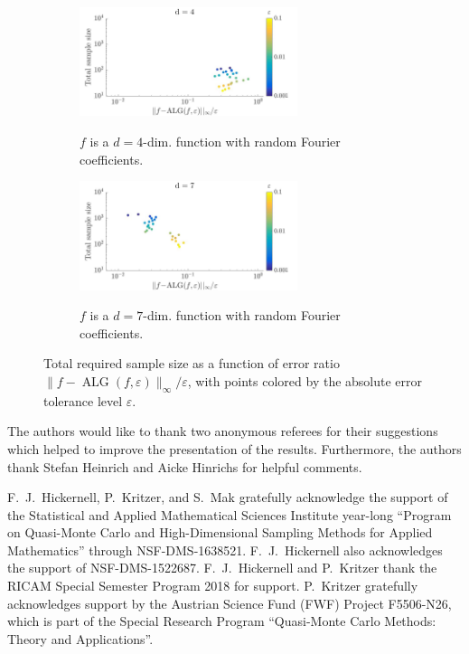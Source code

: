 \documentclass[USenglish]{article}
\theoremstyle{dgthm}
\theoremstyle{dgthm}
\theoremstyle{dgthm}
\theoremstyle{dgthm}
\theoremstyle{dgdef}
\theoremstyle{definition}
\DeclareMathOperator{\DHKMALG}{ALG}
\begin{document}
\begin{figure}
\centering
\begin{subfigure}{\textwidth}
\centering
\includegraphics[width=0.7\textwidth]{d4}
\label{fig:four1}
\caption{$f$ is a $d=4$-dim. function with random Fourier coefficients.}
\end{subfigure}
\begin{subfigure}{\textwidth}
\centering
\includegraphics[width=0.7\textwidth]{d7}
\label{fig:four2}
\caption{$f$ is a $d=7$-dim. function with random Fourier coefficients.}
\end{subfigure}
\caption{Total required sample size as a function of error ratio $\|f - \DHKMALG(f,\varepsilon)\|_{\infty}/\varepsilon$, with points colored by the absolute error tolerance level $\varepsilon$.}
\label{fig:four}
\end{figure}

\begin{acknowledgement}
The authors would like to thank two anonymous referees for their suggestions which helped to improve the presentation of the results. Furthermore, the authors thank 
Stefan Heinrich and Aicke Hinrichs for helpful comments.

F.~J.~Hickernell, P.~Kritzer, and S.~Mak gratefully acknowledge the support of the Statistical and Applied Mathematical Sciences Institute year-long ``Program on Quasi-Monte Carlo and High-Dimensional Sampling Methods for Applied Mathematics'' through NSF-DMS-1638521.  F.~J.~Hickernell also acknowledges the support of NSF-DMS-1522687.
F.~J.~Hickernell and P.~Kritzer thank the RICAM Special Semester Program 2018 for support. P.~Kritzer gratefully acknowledges support by the Austrian Science Fund (FWF) Project  F5506-N26, which is part of the Special Research Program ``Quasi-Monte Carlo Methods: Theory and Applications''.
\end{acknowledgement}





\end{document}
